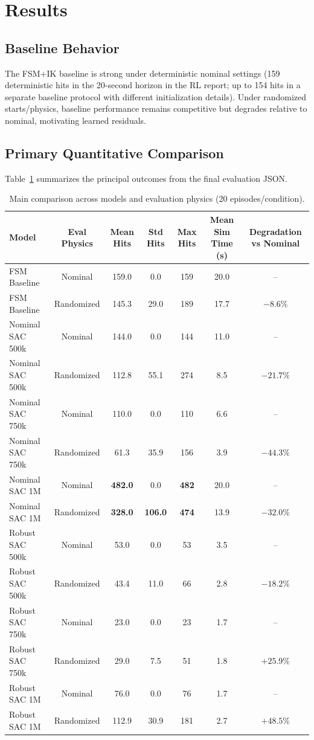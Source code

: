 \documentclass[10pt,twocolumn,letterpaper]{article}
\begin{document}
\section{Results}
\subsection{Baseline Behavior}
The FSM+IK baseline is strong under deterministic nominal settings (159 deterministic hits in the 20-second horizon in the RL report; up to 154 hits in a separate baseline protocol with different initialization details). Under randomized starts/physics, baseline performance remains competitive but degrades relative to nominal, motivating learned residuals.

\subsection{Primary Quantitative Comparison}
Table~\ref{tab:main_results} summarizes the principal outcomes from the final evaluation JSON.

\begin{table}[t]
\centering
\caption{Main comparison across models and evaluation physics (20 episodes/condition).}
\label{tab:main_results}
\begin{tabular}{lcccccc}
\toprule
Model & Eval Physics & Mean Hits & Std Hits & Max Hits & Mean Sim Time (s) & Degradation vs Nominal \\
\midrule
FSM Baseline & Nominal & 159.0 & 0.0 & 159 & 20.0 & -- \\
FSM Baseline & Randomized & 145.3 & 29.0 & 189 & 17.7 & \(-8.6\%\) \\
\midrule
Nominal SAC 500k & Nominal & 144.0 & 0.0 & 144 & 11.0 & -- \\
Nominal SAC 500k & Randomized & 112.8 & 55.1 & 274 & 8.5 & \(-21.7\%\) \\
Nominal SAC 750k & Nominal & 110.0 & 0.0 & 110 & 6.6 & -- \\
Nominal SAC 750k & Randomized & 61.3 & 35.9 & 156 & 3.9 & \(-44.3\%\) \\
Nominal SAC 1M & Nominal & \textbf{482.0} & 0.0 & \textbf{482} & 20.0 & -- \\
Nominal SAC 1M & Randomized & \textbf{328.0} & \textbf{106.0} & \textbf{474} & 13.9 & \(-32.0\%\) \\
\midrule
Robust SAC 500k & Nominal & 53.0 & 0.0 & 53 & 3.5 & -- \\
Robust SAC 500k & Randomized & 43.4 & 11.0 & 66 & 2.8 & \(-18.2\%\) \\
Robust SAC 750k & Nominal & 23.0 & 0.0 & 23 & 1.7 & -- \\
Robust SAC 750k & Randomized & 29.0 & 7.5 & 51 & 1.8 & \(+25.9\%\) \\
Robust SAC 1M & Nominal & 76.0 & 0.0 & 76 & 1.7 & -- \\
Robust SAC 1M & Randomized & 112.9 & 30.9 & 181 & 2.7 & \(+48.5\%\) \\
\bottomrule
\end{tabular}
\end{table}
\end{document}
